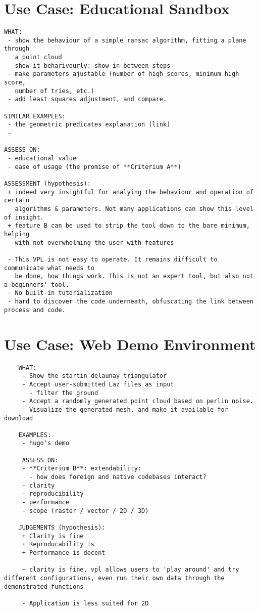 
\section{Use Case: Educational Sandbox}
\begin{lstlisting}
WHAT: 
 - show the behaviour of a simple ransac algorithm, fitting a plane through 
   a point cloud
 - show it beharivourly: show in-between steps
 - make parameters ajustable (number of high scores, minimum high score, 
   number of tries, etc.)
 - add least squares adjustment, and compare.

SIMILAR EXAMPLES: 
 - the geometric predicates explanation (link)
 - 

ASSESS ON: 
 - educational value
 - ease of usage (the promise of **Criterium A**)
 
ASSESSMENT (hypothesis): 
 + indeed very insightful for analying the behaviour and operation of certain 
   algorithms & parameters. Not many applications can show this level of insight. 
 + feature B can be used to strip the tool down to the bare minimum, helping 
   with not overwhelming the user with features

 - This VPL is not easy to operate. It remains difficult to communicate what needs to 
   be done, how things work. This is not an expert tool, but also not a beginners' tool.
 - No built-in tutorialization
 - hard to discover the code underneath, obfuscating the link between process and code.

\end{lstlisting}

\section{Use Case: Web Demo Environment}
\begin{lstlisting}
    WHAT:
     - Show the startin delaunay triangulator
     - Accept user-submitted Laz files as input
       - filter the ground
     - Accept a randomly generated point cloud based on perlin noise.
     - Visualize the generated mesh, and make it available for download

    EXAMPLES: 
     - hugo's demo
    
     ASSESS ON:
     - **Criterium B**: extendability: 
       - how does foreign and native codebases interact? 
     - clarity
     - reproducibility
     - performance
     - scope (raster / vector / 2D / 3D)

    JUDGEMENTS (hypothesis): 
     + Clarity is fine
     + Reproducability is 
     + Performance is decent

     ~ clarity is fine, vpl allows users to 'play around' and try different configurations, even run their own data through the demonstrated functions

     - Application is less suited for 2D 
    
\end{lstlisting}


